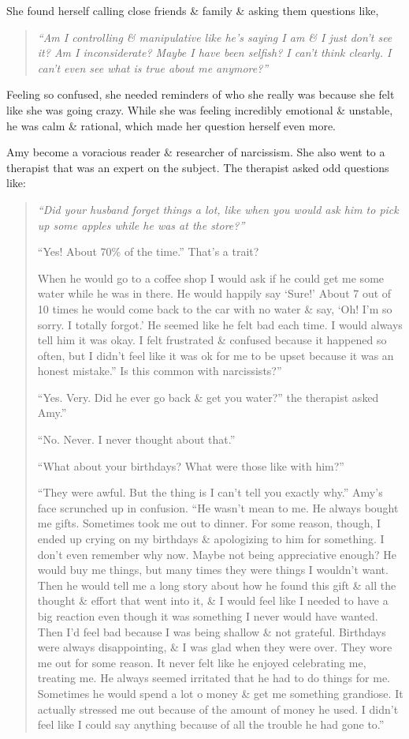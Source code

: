 \documentclass{article}
\numberwithin{equation}{section}
\begin{document}
She found herself calling close friends \& family \& asking them questions like,
\begin{quotation}\it
	``Am I controlling \& manipulative like he's saying I am \& I just don't see it? Am I inconsiderate? Maybe I have been selfish? I can't think clearly. I can't even see what is true about me anymore?''
\end{quotation}
Feeling so confused, she needed reminders of who she really was because she felt like she was going crazy. While she was feeling incredibly emotional \& unstable, he was calm \& rational, which made her question herself even more.

Amy become a voracious reader \& researcher of narcissism. She also went to a therapist that was an expert on the subject. The therapist asked odd questions like:
\begin{quotation}\it
	``Did your husband forget things a lot, like when you would ask him to pick up some apples while he was at the store?''
	
	``Yes! About 70\% of the time.'' That's a trait?
	
	When he would go to a coffee shop I would ask if he could get me some water while he was in there. He would happily say `Sure!' About 7 out of 10 times he would come back to the car with no water \& say, `Oh! I'm so sorry. I totally forgot.' He seemed like he felt bad each time. I would always tell him it was okay. I felt frustrated \& confused because it happened so often, but I didn't feel like it was ok for me to be upset because it was an honest mistake.'' Is this common with narcissists?''
	
	``Yes. Very. Did he ever go back \& get you water?'' the therapist asked Amy.''
	
	``No. Never. I never thought about that.''
	
	``What about your birthdays? What were those like with him?''
	
	``They were awful. But the thing is I can't tell you exactly why.'' Amy's face scrunched up in confusion. ``He wasn't mean to me. He always bought me gifts. Sometimes took me out to dinner. For some reason, though, I ended up crying on my birthdays \& apologizing to him for something. I don't even remember why now. Maybe not being appreciative enough? He would buy me things, but many times they were things I wouldn't want. Then he would tell me a long story about how he found this gift \& all the thought \& effort that went into it, \& I would feel like I needed to have a big reaction even though it was something I never would have wanted. Then I'd feel bad because I was being shallow \& not grateful. Birthdays were always disappointing, \& I was glad when they were over. They wore me out for some reason. It never felt like he enjoyed celebrating me, treating me. He always seemed irritated that he had to do things for me. Sometimes he would spend a lot o money \& get me something grandiose. It actually stressed me out because of the amount of money he used. I didn't feel like I could say anything because of all the trouble he had gone to.''
	

\end{quotation}
\end{document}
